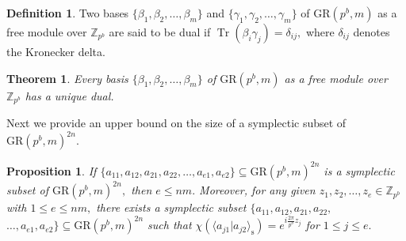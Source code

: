 \documentclass{article}
\DeclareMathOperator{\Tr}{Tr}
\newtheorem{thm}{Theorem}[section]
\newtheorem{prop}{Proposition}[section]
\theoremstyle{remark}
\theoremstyle{definition}
\newtheorem{defin}{Definition}[section]
\numberwithin{equation}{section}
\begin{document}
\begin{defin}\cite{sison} Two bases $\{\beta_1,\beta_2,\ldots,\beta_m\}$ and  $\{\gamma_1,\gamma_2,\ldots,\gamma_m\}$ of $\text{GR}(p^b,m)$ as a free module over $\mathbb{Z}_{p^b}$ are said to be dual if ${\Tr}(\beta_i\gamma_j)=\delta_{ij},$ where $\delta_{ij}$ denotes the Kronecker delta.\end{defin}
\begin{thm}\cite{sison} Every basis $\{\beta_1,\beta_2,\ldots,\beta_m\}$  of $\text{GR}(p^b,m)$ as a free module over $\mathbb{Z}_{p^b}$ has a unique dual.
\end{thm}
 Next we provide an upper bound on the size of a symplectic subset of $\text{GR}(p^b,m)^{2n}.$
\begin{prop}\label{prop:symGR}  If $\{a_{11},a_{12},a_{21},a_{22},\ldots,a_{e1},a_{e2}\} \subseteq \text{GR}(p^b,m)^{2n}$ is a symplectic subset of $\text{GR}(p^b,m)^{2n},$ then $e \leq nm.$ Moreover, for any given $z_1,z_2,\ldots,z_e \in \mathbb{Z}_{p^b}$ with $1 \leq e \leq nm,$ there exists a symplectic subset $\{a_{11},a_{12},a_{21},a_{22},$ $\ldots,a_{e1},a_{e2}\} \subseteq \text{GR}(p^b,m)^{2n}$ such that $ \chi(\langle a_{j1} |  a_{j2}\rangle_{\text{s}})= e^{i \frac{2\pi }{p^b} z_j  }$ for $1\leq j \leq e.$
\end{prop}
\end{document}
